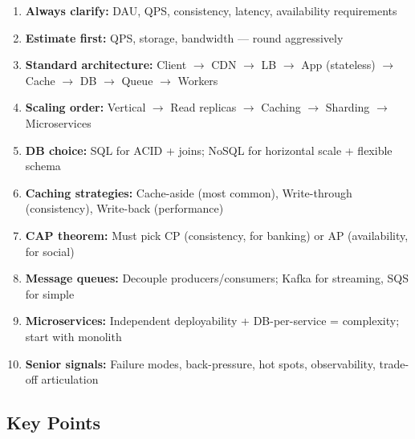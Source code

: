 \documentclass[11pt]{article}
\providecommand{\tightlist}{\setlength{\itemsep}{1pt}\setlength{\parskip}{0pt}}
\begin{document}
\begin{enumerate}
\def\labelenumi{\arabic{enumi}.}
\tightlist
\item
  \textbf{Always clarify:} DAU, QPS, consistency, latency, availability requirements
\item
  \textbf{Estimate first:} QPS, storage, bandwidth --- round aggressively
\item
  \textbf{Standard architecture:} Client \(\rightarrow\) CDN \(\rightarrow\) LB \(\rightarrow\) App (stateless) \(\rightarrow\) Cache \(\rightarrow\) DB \(\rightarrow\) Queue \(\rightarrow\) Workers
\item
  \textbf{Scaling order:} Vertical \(\rightarrow\) Read replicas \(\rightarrow\) Caching \(\rightarrow\) Sharding \(\rightarrow\) Microservices
\item
  \textbf{DB choice:} SQL for ACID + joins; NoSQL for horizontal scale + flexible schema
\item
  \textbf{Caching strategies:} Cache-aside (most common), Write-through (consistency), Write-back (performance)
\item
  \textbf{CAP theorem:} Must pick CP (consistency, for banking) or AP (availability, for social)
\item
  \textbf{Message queues:} Decouple producers/consumers; Kafka for streaming, SQS for simple
\item
  \textbf{Microservices:} Independent deployability + DB-per-service = complexity; start with monolith
\item
  \textbf{Senior signals:} Failure modes, back-pressure, hot spots, observability, trade-off articulation
\end{enumerate}

\subsection{Key Points}\label{key-points}
\end{document}
